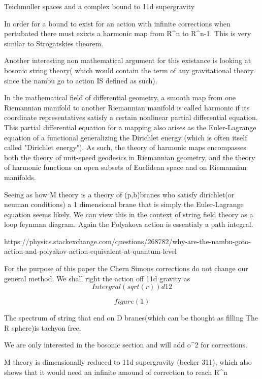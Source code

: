							Teichmuller spaces and a complex bound to 
						11d supergravity

In order for a bound to exist for an action with infinite corrections when pertubated there must  exixts a harmonic map from R^n to R^n-1. This is very similar to Strogatskies theorem. 

Another interesting non mathematical argument for this existance is looking at bosonic string theory( which would contain the term of any gravitational theory since the nambu go to action IS defined as such).

In the mathematical field of differential geometry, a smooth map from one Riemannian manifold to another Riemannian manifold is called harmonic if its coordinate representatives satisfy a certain nonlinear partial differential equation. This partial differential equation for a mapping also arises as the Euler-Lagrange equation of a functional generalizing the Dirichlet energy (which is often itself called "Dirichlet energy"). As such, the theory of harmonic maps encompasses both the theory of unit-speed geodesics in Riemannian geometry, and the theory of harmonic functions on open subsets of Euclidean space and on Riemannian manifolds. 

Seeing as how M theory is a theory of (p,b)branes who satisfy  dirichlet(or neuman conditions) a 1 dimensional brane that is simply the Euler-Lagrange equation seems likely. We can view this in the context of string field theory as a loop feynman diagram. Again the Polyakova action is essentialy a path integral.

https://physics.stackexchange.com/questions/268782/why-are-the-nambu-goto-action-and-polyakov-action-equivalent-at-quantum-level

For the purpose of this paper the Chern Simons corrections do not change our general method. We shall right the action off 11d gravity as $$Intergral(sqrt(r))d12 $$

$$figure(1)$$

The spectrum of string that end on D branes(which can be thought as filling The R sphere)is tachyon free.

We are only interested in the bosonic section and will add o^2 for corrections.

M theory is dimensionally reduced to 11d supergravity (becker 311), which also shows that it would need an infinite amound of correction to reach R^n



